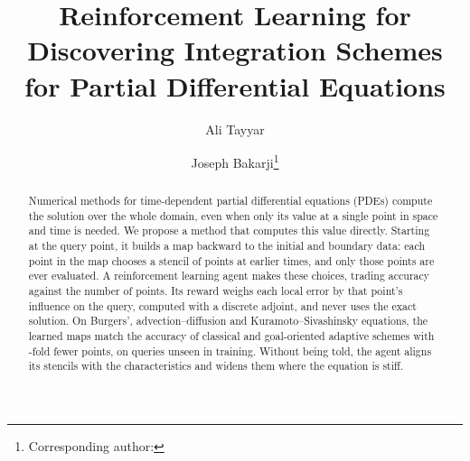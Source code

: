 \documentclass[11pt]{article}
\title{Reinforcement Learning for Discovering Integration Schemes\\
       for Partial Differential Equations}
\author[1]{Ali Tayyar}
\author[1]{Joseph Bakarji\thanks{Corresponding author: \texttt{\TODO{email}}}}
\affil[1]{Department of Mechanical Engineering, American University of Beirut, Beirut, Lebanon}
\date{}
\begin{document}
\maketitle
\onehalfspacing

\begin{abstract}
Numerical methods for time-dependent partial differential equations (PDEs) compute the solution over the whole domain, even when only its value at a single point in space and time is needed. We propose a method that computes this value directly. Starting at the query point, it builds a map backward to the initial and boundary data: each point in the map chooses a stencil of points at earlier times, and only those points are ever evaluated. A reinforcement learning agent makes these choices, trading accuracy against the number of points. Its reward weighs each local error by that point's influence on the query, computed with a discrete adjoint, and never uses the exact solution. On Burgers', advection--diffusion and Kuramoto--Sivashinsky equations, the learned maps match the accuracy of classical and goal-oriented adaptive schemes with -fold fewer points, on queries unseen in training. Without being told, the agent aligns its stencils with the characteristics and widens them where the equation is stiff.
\end{abstract}


\end{document}
